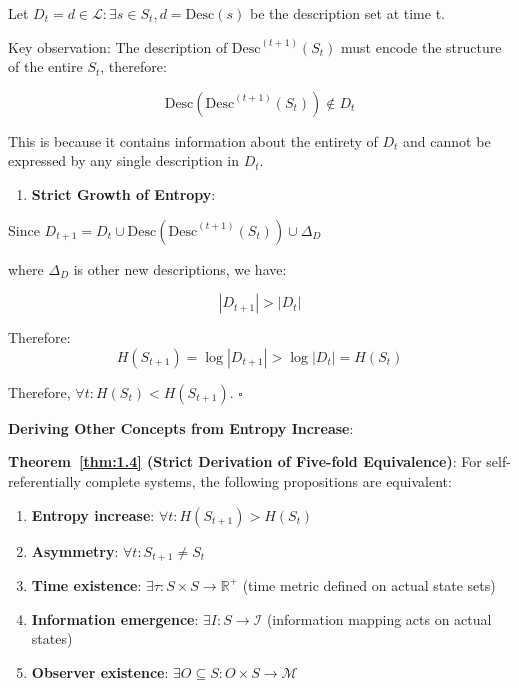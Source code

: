    Let $D_t = {d \in \mathcal{L}: \exists s \in S_t, d = \text{Desc}(s)}$ be the description set at time t.
   
   Key observation: The description of $\text{Desc}^{(t+1)}(S_t)$ must encode the structure of the entire $S_t$, therefore:
   
\begin{equation}
\text{Desc}(\text{Desc}^{(t+1)}(S_t)) \notin D_t
\end{equation}
   
   This is because it contains information about the entirety of $D_t$ and cannot be expressed by any single description in $D_t$.

\begin{enumerate}
\item \textbf{Strict Growth of Entropy}:
\end{enumerate}
   Since $D_{t+1} = D_t \cup {\text{Desc}(\text{Desc}^{(t+1)}(S_t))} \cup \Delta_D$
   
   where $\Delta_D$ is other new descriptions, we have:
   
\begin{equation}
|D_{t+1}| > |D_t|
\end{equation}
   
   Therefore:
\begin{equation}
H(S_{t+1}) = \log |D_{t+1}| > \log |D_t| = H(S_t)
\end{equation}

Therefore, $\forall t: H(S_t) < H(S_{t+1})$. $\square$

\textbf{Deriving Other Concepts from Entropy Increase}:

\textbf{Theorem~\ref{thm:1.4} (Strict Derivation of Five-fold Equivalence)}:
\label{thm:1.4}
For self-referentially complete systems, the following propositions are equivalent:

\begin{enumerate}
\item \textbf{Entropy increase}: $\forall t: H(S_{t+1}) > H(S_t)$
\item \textbf{Asymmetry}: $\forall t: S_{t+1} \neq S_t$
\item \textbf{Time existence}: $\exists \tau: S \times S \to \mathbb{R}^+$ (time metric defined on actual state sets)
\item \textbf{Information emergence}: $\exists I: S \to \mathcal{I}$ (information mapping acts on actual states)
\item \textbf{Observer existence}: $\exists O \subseteq S: O \times S \to \mathcal{M}$
\end{enumerate}

